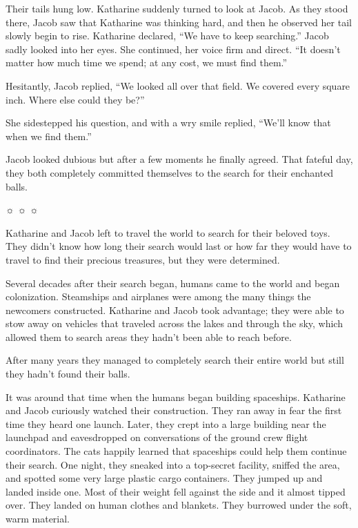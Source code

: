 Their tails hung low. Katharine suddenly turned to look at Jacob. As they stood there, Jacob saw that Katharine was thinking hard, and then he observed her tail slowly begin to rise. Katharine declared, “We have to keep searching.” Jacob sadly looked into her eyes. She continued, her voice firm and direct. “It doesn't matter how much time we spend; at any cost, we must find them.”

Hesitantly, Jacob replied, “We looked all over that field. We covered every square inch. Where else could they be?”

She sidestepped his question, and with a wry smile replied, “We'll know that when we find them.”

Jacob looked dubious but after a few moments he finally agreed. That fateful day, they both completely committed themselves to the search for their enchanted balls.



{\small \begin{center}
		☼ ☼ ☼
\end{center}}



Katharine and Jacob left to travel the world to search for their beloved toys. They didn't know how long their search would last or how far they would have to travel to find their precious treasures, but they were determined.

Several decades after their search began, humans came to the world and began colonization. Steamships and airplanes were among the many things the newcomers constructed. Katharine and Jacob took advantage; they were able to stow away on vehicles that traveled across the lakes and through the sky, which allowed them to search areas they hadn't been able to reach before.

After many years they managed to completely search their entire world but still they hadn't found their balls.

It was around that time when the humans began building spaceships. Katharine and Jacob curiously watched their construction. They ran away in fear the first time they heard one launch. Later, they crept into a large building near the launchpad and eavesdropped on conversations of the ground crew flight coordinators. The cats happily learned that spaceships could help them continue their search. One night, they sneaked into a top-secret facility, sniffed the area, and spotted some very large plastic cargo containers. They jumped up and landed inside one. Most of their weight fell against the side and it almost tipped over. They landed on human clothes and blankets. They burrowed under the soft, warm material.


